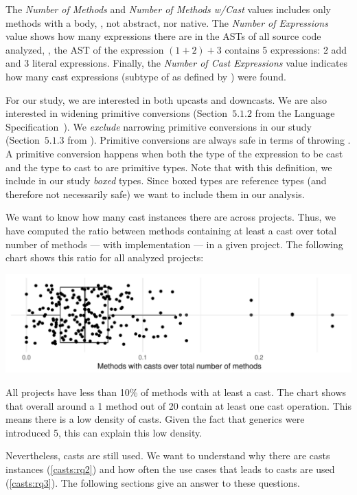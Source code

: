 The \emph{Number of Methods} and \emph{Number of Methods w/Cast} values includes only methods with a body, \ie{}, not abstract, nor native.
The \emph{Number of Expressions} value shows how many expressions there are in the ASTs of all source code analyzed, \eg,
the AST of the expression $(1+2)+3$ contains 5 expressions: 2 add and 3 literal expressions.
Finally, the \emph{Number of Cast Expressions} value indicates how many cast expressions (subtype of  as defined by \ql{}) were found.

For our study, we are interested in both upcasts and downcasts.
We are also interested in widening primitive conversions
(Section~$5.1.2$ from the \java{} Language Specification~\citep{Gosling:2013:JLS:2462622}).
We \emph{exclude} narrowing primitive conversions in our study
(Section~$5.1.3$ from \cite{Gosling:2013:JLS:2462622}).
Primitive conversions are always safe in terms of throwing .
A primitive conversion happens when both the type of the expression to be cast and the type to cast to are primitive types.
Note that with this definition, we include in our study \emph{boxed} types.
Since boxed types are reference types (and therefore not necessarily safe)
we want to include them in our analysis.

We want to know how many cast instances there are across projects.
Thus, we have computed the ratio between methods containing
at least a cast over total number of methods --- with implementation --- in a given project.
The following chart shows this ratio for all analyzed projects:

\includegraphics[width=0.9\columnwidth]{chapters/casts/stats-methodwcastXproject.pdf}

All projects have less than 10\% of methods with at least a cast.
The chart shows that overall around a
1 method out of 20 
contain at least one cast operation. 
This means there is a low density of casts.
Given the fact that generics were introduced \java{} 5, this can explain this low density.

Nevertheless, casts are still used.
We want to understand why there are casts instances (\ref{casts:rq2}) and how often the use cases that leads to casts are used (\ref{casts:rq3}).
The following sections give an answer to these questions.
